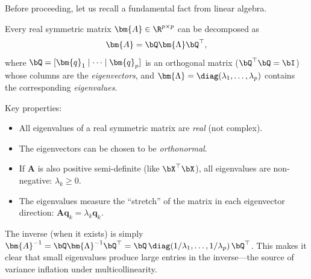 \medskip
\begin{remark}
Before proceeding, let us recall a fundamental fact from linear algebra.

Every real symmetric matrix $\bm{A} \in \R^{p \times p}$ can be
decomposed as
\[
  \bm{A} = \bQ \bm{\Lambda} \bQ^\top,
\]
where $\bQ = [\bm{q}_1 \mid \cdots \mid \bm{q}_p]$ is an orthogonal
matrix ($\bQ^\top \bQ = \bI$) whose columns are the \emph{eigenvectors},
and $\bm{\Lambda} = \diag(\lambda_1, \dots, \lambda_p)$ contains the
corresponding \emph{eigenvalues}.

Key properties:
\begin{itemize}[nosep]
  \item All eigenvalues of a real symmetric matrix are \emph{real}
        (not complex).
  \item The eigenvectors can be chosen to be \emph{orthonormal}.
  \item If $\bm{A}$ is also positive semi-definite (like $\bX^\top\bX$),
        all eigenvalues are non-negative: $\lambda_k \ge 0$.
  \item The eigenvalues measure the ``stretch'' of the matrix in each
        eigenvector direction: $\bm{A}\bm{q}_k = \lambda_k \bm{q}_k$.
\end{itemize}

The inverse (when it exists) is simply
$\bm{A}^{-1} = \bQ \bm{\Lambda}^{-1} \bQ^\top
= \bQ \, \diag(1/\lambda_1, \dots, 1/\lambda_p) \, \bQ^\top$.
This makes it clear that small eigenvalues produce large entries in the
inverse---the source of variance inflation under multicollinearity.
\end{remark}



